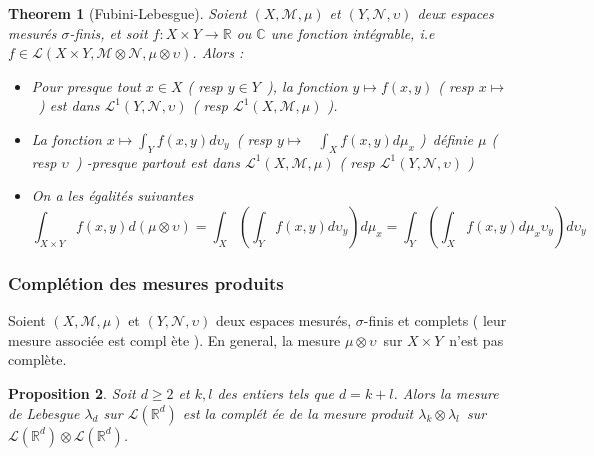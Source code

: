 \documentclass[3pt]{article}
\newtheorem{theorem}{Theorem}
\newtheorem{proposition}[theorem]{Proposition}
\begin{document}
\begin{theorem}[Fubini-Lebesgue]
Soient $(X,\mathcal{M},\mu )$ et $(Y,\mathcal{N},\upsilon )$ deux espaces
mesur\'{e}s $\sigma $-finis, et soit $f:X\times Y\rightarrow \mathbb{R}$ ou $%
\mathbb{C}$ une fonction int\'{e}grable, i.e $f\in \mathcal{L}(X\times Y,%
\mathcal{M}\otimes \mathcal{N},\mu \otimes \upsilon )$. Alors :

\begin{itemize}
\item Pour presque tout $x\in X$ ( resp $y\in Y$\ ), la fonction $y\mapsto
f(x,y)$ ( resp $x\mapsto $\ ) est dans $\mathcal{L}^{1}(Y,\mathcal{N}%
,\upsilon )$ ( resp $\mathcal{L}^{1}(X,\mathcal{M},\mu )$ ).

\item La fonction $x\mapsto \int_{Y}f(x,y)d\upsilon _{y}$\ ( resp $y\mapsto $%
\ $\int_{X}f(x,y)d\mu _{x}$ )\ d\'{e}finie $\mu $ ( resp $\upsilon $\ )
-presque partout est dans $\mathcal{L}^{1}(X,\mathcal{M},\mu )$ ( resp $%
\mathcal{L}^{1}(Y,\mathcal{N},\upsilon )$ )

\item On a les \'{e}galit\'{e}s suivantes 
\begin{equation*}
\int_{X\times Y}f(x,y)d(\mu \otimes \upsilon )=\int_{X}\left(
\int_{Y}f(x,y)d\upsilon _{y}\right) d\mu _{x}=\int_{Y}\left(
\int_{X}f(x,y)d\mu _{x}\upsilon _{y}\right) d\upsilon _{y}
\end{equation*}
\end{itemize}
\end{theorem}

\bigskip

\subsubsection{Compl\'{e}tion des mesures produits}

Soient $(X,\mathcal{M},\mu )$ et $(Y,\mathcal{N},\upsilon )$ deux espaces
mesur\'{e}s, $\sigma $-finis et complets ( leur mesure associ\'{e}e est compl%
\`{e}te ). En general, la mesure $\mu \otimes \upsilon $\ sur $X\times Y$\
n'est pas compl\`{e}te.

\bigskip

\begin{proposition}
Soit $d\geq 2$ et $k,l$ des entiers tels que $d=k+l$. Alors la mesure de
Lebesgue $\lambda _{d}$ sur $\mathcal{L}(\mathbb{R}^{d})$ est la compl\'{e}t%
\'{e}e de la mesure produit $\lambda _{k}\otimes \lambda _{l}$\ sur $%
\mathcal{L}(\mathbb{R}^{d})\otimes \mathcal{L}(\mathbb{R}^{d})$.
\end{proposition}
\end{document}
